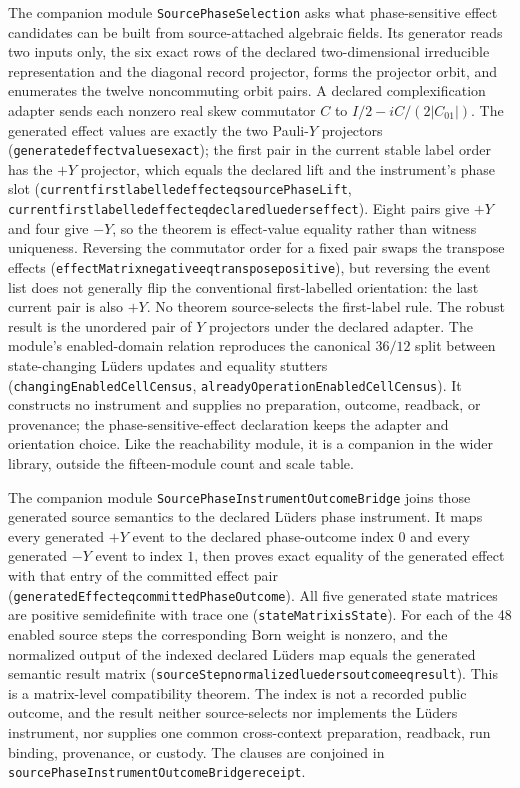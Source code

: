 \documentclass[11pt]{article}
\renewcommand{\_}{\textunderscore\allowbreak}
\theoremstyle{remark}
\begin{document}
The companion module \texttt{SourcePhaseSelection} asks what phase-sensitive
effect candidates can be built from source-attached algebraic fields. Its
generator reads two inputs only, the six exact rows of the declared
two-dimensional irreducible representation and the diagonal record projector,
forms the projector orbit, and enumerates the twelve noncommuting orbit pairs.
A declared complexification adapter sends each nonzero real skew commutator
$C$ to $I/2-iC/(2|C_{01}|)$. The generated effect values are exactly the two Pauli-$Y$
projectors (\texttt{generated\_effect\_values\_exact}); the first pair in
the current stable label order has the $+Y$ projector, which equals the
declared lift and the instrument's phase slot
(\texttt{current\_first\_labelled\_effect\_eq\_sourcePhaseLift},
\texttt{current\_first\_labelled\_effect\_eq\_declared\_lueders\_effect}).
Eight pairs give $+Y$ and four give $-Y$, so the theorem is effect-value
equality rather than witness uniqueness. Reversing the commutator order for a
fixed pair swaps the transpose effects
(\texttt{effectMatrix\_negative\_eq\_transpose\_positive}), but reversing the
event list does not generally flip the conventional first-labelled orientation: the last current
pair is also $+Y$. No theorem source-selects the first-label rule. The robust
result is the unordered pair of $Y$ projectors under the declared adapter. The
module's enabled-domain relation reproduces the canonical $36/12$ split
between state-changing L\"uders updates and equality stutters
(\texttt{changingEnabledCellCensus},
\texttt{alreadyOperationEnabledCellCensus}). It constructs no instrument
and supplies no preparation, outcome, readback, or provenance; the
phase-sensitive-effect declaration keeps the adapter and orientation choice. Like the
reachability module, it is a companion in the wider library, outside the
fifteen-module count and scale table.

The companion module
\texttt{SourcePhaseInstrumentOutcomeBridge} joins those generated source
semantics to the declared L\"uders phase instrument. It maps every
generated $+Y$ event to the declared phase-outcome index $0$ and every
generated $-Y$ event to index $1$, then proves exact equality of the generated
effect with that entry of the committed effect pair
(\texttt{generatedEffect\_eq\_committedPhaseOutcome}). All five generated
state matrices are positive semidefinite with trace one
(\texttt{stateMatrix\_isState}). For each of the 48
enabled source steps the corresponding Born weight is nonzero, and the
normalized output of the indexed declared L\"uders map equals the generated
semantic result matrix
(\texttt{sourceStep\_normalized\_lueders\_outcome\_eq\_result}). This is a
matrix-level compatibility theorem. The index is not a recorded public
outcome, and the result neither source-selects nor implements the L\"uders
instrument, nor supplies one common cross-context preparation, readback, run
binding, provenance, or custody. The clauses are conjoined in
\texttt{sourcePhaseInstrumentOutcomeBridge\_receipt}.
\end{document}
